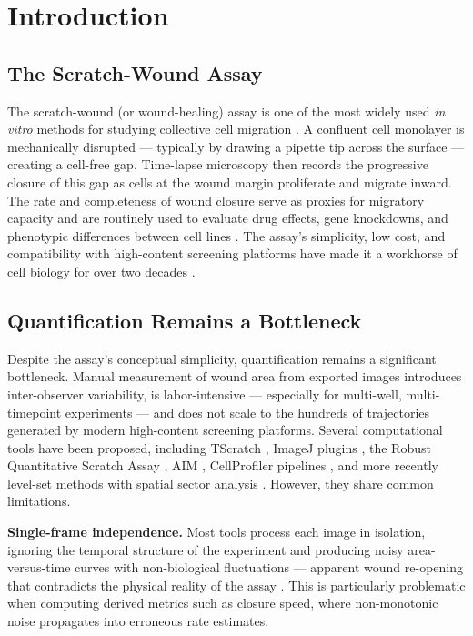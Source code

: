 \section{Introduction}

\subsection{The Scratch-Wound Assay}

The scratch-wound (or wound-healing) assay is one of the most widely used \emph{in vitro}
methods for studying collective cell migration
\citep{Liang2007,Jonkman2014,Grada2017}.
A confluent cell monolayer is mechanically disrupted ---
typically by drawing a pipette tip across the surface --- creating a cell-free gap.
Time-lapse microscopy then records the progressive closure of this gap as cells at the wound
margin proliferate and migrate inward.
The rate and completeness of wound closure serve as proxies for migratory capacity and are
routinely used to evaluate drug effects, gene knockdowns, and phenotypic differences between
cell lines \citep{Yarrow2004,Ashby2012,Pinto2023}.
The assay's simplicity, low cost, and compatibility with high-content screening platforms have
made it a workhorse of cell biology for over two decades \citep{Stamm2016}.

\subsection{Quantification Remains a Bottleneck}

Despite the assay's conceptual simplicity, quantification remains a significant bottleneck.
Manual measurement of wound area from exported images introduces inter-observer variability,
is labor-intensive --- especially for multi-well, multi-timepoint experiments --- and does not
scale to the hundreds of trajectories generated by modern high-content screening platforms.
Several computational tools have been proposed, including TScratch \citep{Gebaeck2009},
ImageJ plugins \citep{Suarez2020}, the Robust Quantitative Scratch Assay \citep{Vargas2016},
AIM \citep{Nunes2017}, CellProfiler pipelines \citep{McQuin2018},
and more recently level-set methods with spatial sector analysis \citep{Martinotti2025}.
However, they share common limitations.

\textbf{Single-frame independence.}
Most tools process each image in isolation, ignoring the temporal structure of the experiment
and producing noisy area-versus-time curves with non-biological fluctuations ---
apparent wound re-opening that contradicts the physical reality of the assay
\citep{Treloar2013}.
This is particularly problematic when computing derived metrics such as closure speed,
where non-monotonic noise propagates into erroneous rate estimates.

